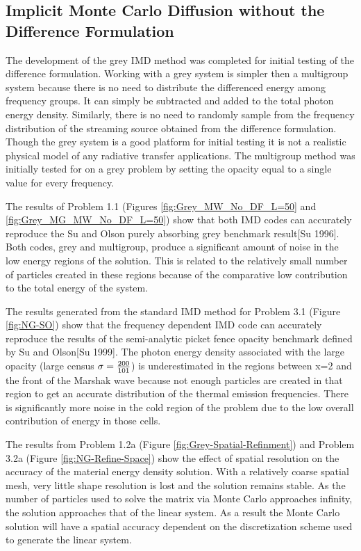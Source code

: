 \subsection{Implicit Monte Carlo Diffusion without the Difference Formulation}
\label{sec:Conclusions-Non-Grey-IMD}

\noindent
	\indent The development of the grey IMD method was completed for initial testing of the difference formulation. Working with a grey system is simpler then a multigroup system because there is no need to distribute the differenced energy among frequency groups. It can simply be subtracted and added to the total photon energy density. Similarly, there is no need to randomly sample from the frequency distribution of the streaming source obtained from the difference formulation. Though the grey system is a good platform for initial testing it is not a realistic physical model of any radiative transfer applications. The multigroup method was initially tested for on a grey problem by setting the opacity equal to a single value for every frequency.

	The results of Problem 1.1 (Figures \ref{fig:Grey_MW_No_DF_L=50} and \ref{fig:Grey_MG_MW_No_DF_L=50}) show that both IMD codes can accurately reproduce the Su and Olson purely absorbing grey benchmark result[Su 1996]. Both codes, grey and multigroup, produce a significant amount of noise in the low energy regions of the solution. This is related to the relatively small number of particles created in these regions because of the comparative low contribution to the total energy of the system. 

	The results generated from the standard IMD method for Problem 3.1 (Figure \ref{fig:NG-SO}) show that the frequency dependent IMD code can accurately reproduce the results of the semi-analytic picket fence opacity benchmark defined by Su and Olson[Su 1999]. The photon energy density associated with the large opacity (large census $\sigma={200\over{101}}$) is underestimated in the regions between x=2 and the front of the Marshak wave because not enough particles are created in that region to get an accurate distribution of the thermal emission frequencies. There is significantly more noise in the cold region of the problem due to the low overall contribution of energy in those cells.

	The results from Problem 1.2a (Figure \ref{fig:Grey-Spatial-Refinment}) and Problem 3.2a (Figure \ref{fig:NG-Refine-Space}) show the effect of spatial resolution on the accuracy of the material energy density solution. With a relatively coarse spatial mesh, very little shape resolution is lost and the solution remains stable. As the number of particles used to solve the matrix via Monte Carlo approaches infinity, the solution approaches that of the linear system. As a result the Monte Carlo solution will have a spatial accuracy dependent on the discretization scheme used to generate the linear system. 

